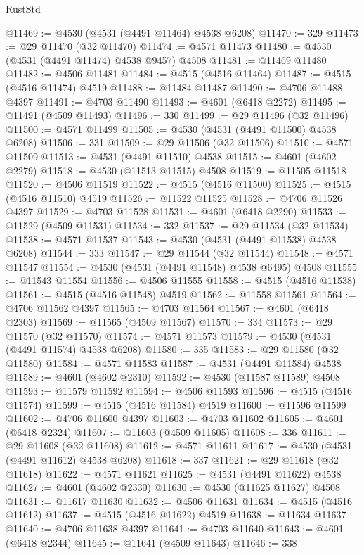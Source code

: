 \begin{lexlean}{RustStd}
\begin{coremodule}
@11469 := @4530 (@4531 (@4491 @11464) @4538 @6208)
@11470 := 329
@11473 := @29 @11470 (@32 @11470)
@11474 := @4571 @11473
@11480 := @4530 (@4531 (@4491 @11474) @4538 @9457) @4508
@11481 := @11469 @11480
@11482 := @4506 @11481
@11484 := @4515 (@4516 @11464)
@11487 := @4515 (@4516 @11474) @4519
@11488 := @11484 @11487
@11490 := @4706 @11488 @4397
@11491 := @4703 @11490
@11493 := @4601 (@6418 @2272)
@11495 := @11491 (@4509 @11493)
@11496 := 330
@11499 := @29 @11496 (@32 @11496)
@11500 := @4571 @11499
@11505 := @4530 (@4531 (@4491 @11500) @4538 @6208)
@11506 := 331
@11509 := @29 @11506 (@32 @11506)
@11510 := @4571 @11509
@11513 := @4531 (@4491 @11510) @4538
@11515 := @4601 (@4602 @2279)
@11518 := @4530 (@11513 @11515) @4508
@11519 := @11505 @11518
@11520 := @4506 @11519
@11522 := @4515 (@4516 @11500)
@11525 := @4515 (@4516 @11510) @4519
@11526 := @11522 @11525
@11528 := @4706 @11526 @4397
@11529 := @4703 @11528
@11531 := @4601 (@6418 @2290)
@11533 := @11529 (@4509 @11531)
@11534 := 332
@11537 := @29 @11534 (@32 @11534)
@11538 := @4571 @11537
@11543 := @4530 (@4531 (@4491 @11538) @4538 @6208)
@11544 := 333
@11547 := @29 @11544 (@32 @11544)
@11548 := @4571 @11547
@11554 := @4530 (@4531 (@4491 @11548) @4538 @6495) @4508
@11555 := @11543 @11554
@11556 := @4506 @11555
@11558 := @4515 (@4516 @11538)
@11561 := @4515 (@4516 @11548) @4519
@11562 := @11558 @11561
@11564 := @4706 @11562 @4397
@11565 := @4703 @11564
@11567 := @4601 (@6418 @2303)
@11569 := @11565 (@4509 @11567)
@11570 := 334
@11573 := @29 @11570 (@32 @11570)
@11574 := @4571 @11573
@11579 := @4530 (@4531 (@4491 @11574) @4538 @6208)
@11580 := 335
@11583 := @29 @11580 (@32 @11580)
@11584 := @4571 @11583
@11587 := @4531 (@4491 @11584) @4538
@11589 := @4601 (@4602 @2310)
@11592 := @4530 (@11587 @11589) @4508
@11593 := @11579 @11592
@11594 := @4506 @11593
@11596 := @4515 (@4516 @11574)
@11599 := @4515 (@4516 @11584) @4519
@11600 := @11596 @11599
@11602 := @4706 @11600 @4397
@11603 := @4703 @11602
@11605 := @4601 (@6418 @2324)
@11607 := @11603 (@4509 @11605)
@11608 := 336
@11611 := @29 @11608 (@32 @11608)
@11612 := @4571 @11611
@11617 := @4530 (@4531 (@4491 @11612) @4538 @6208)
@11618 := 337
@11621 := @29 @11618 (@32 @11618)
@11622 := @4571 @11621
@11625 := @4531 (@4491 @11622) @4538
@11627 := @4601 (@4602 @2330)
@11630 := @4530 (@11625 @11627) @4508
@11631 := @11617 @11630
@11632 := @4506 @11631
@11634 := @4515 (@4516 @11612)
@11637 := @4515 (@4516 @11622) @4519
@11638 := @11634 @11637
@11640 := @4706 @11638 @4397
@11641 := @4703 @11640
@11643 := @4601 (@6418 @2344)
@11645 := @11641 (@4509 @11643)
@11646 := 338

\end{coremodule}
\end{lexlean}
